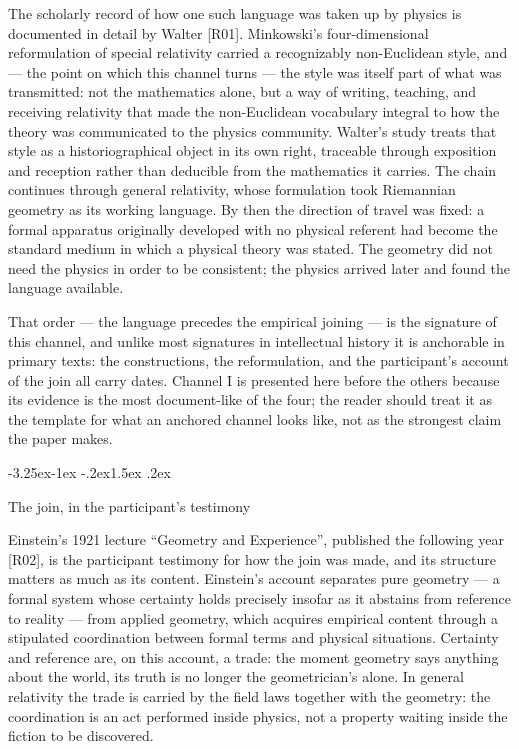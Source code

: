 \documentclass[11pt,a4paper]{article}
\makeatletter
\renewcommand\subsection{\@startsection{subsection}{2}{\z@}%
  {-3.25ex\@plus -1ex \@minus -.2ex}{1.5ex \@plus .2ex}%
  {\normalfont\large\bfseries\raggedright}}
\makeatother
\begin{document}
The scholarly record of how one such language was taken up by physics is documented in detail by Walter [R01]. Minkowski's four-dimensional reformulation of special relativity carried a recognizably non-Euclidean style, and — the point on which this channel turns — the style was itself part of what was transmitted: not the mathematics alone, but a way of writing, teaching, and receiving relativity that made the non-Euclidean vocabulary integral to how the theory was communicated to the physics community. Walter's study treats that style as a historiographical object in its own right, traceable through exposition and reception rather than deducible from the mathematics it carries. The chain continues through general relativity, whose formulation took Riemannian geometry as its working language. By then the direction of travel was fixed: a formal apparatus originally developed with no physical referent had become the standard medium in which a physical theory was stated. The geometry did not need the physics in order to be consistent; the physics arrived later and found the language available.

That order — the language precedes the empirical joining — is the signature of this channel, and unlike most signatures in intellectual history it is anchorable in primary texts: the constructions, the reformulation, and the participant's account of the join all carry dates. Channel I is presented here before the others because its evidence is the most document-like of the four; the reader should treat it as the template for what an anchored channel looks like, not as the strongest claim the paper makes.

\subsection{The join, in the participant's testimony}

Einstein's 1921 lecture ``Geometry and Experience'', published the following year [R02], is the participant testimony for how the join was made, and its structure matters as much as its content. Einstein's account separates pure geometry — a formal system whose certainty holds precisely insofar as it abstains from reference to reality — from applied geometry, which acquires empirical content through a stipulated coordination between formal terms and physical situations. Certainty and reference are, on this account, a trade: the moment geometry says anything about the world, its truth is no longer the geometrician's alone. In general relativity the trade is carried by the field laws together with the geometry: the coordination is an act performed inside physics, not a property waiting inside the fiction to be discovered.
\end{document}
